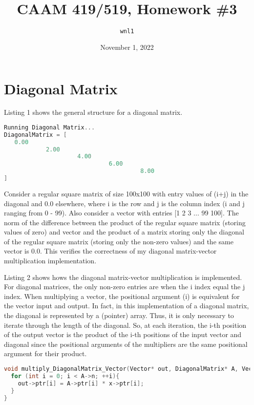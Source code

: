 \documentclass{article}
\title{CAAM 419/519, Homework \#3}
\author{\texttt{wnl1}}
\date{November 1, 2022}
\begin{document}
\maketitle

\section{Diagonal Matrix}

Listing 1 shows the general structure for a diagonal matrix.

\begin{lstlisting}[language=C, basicstyle=\ttfamily, caption={Diagonal Matrix Output.}]
Running Diagonal Matrix...
DiagonalMatrix = [
   0.00                                      
            2.00                             
                     4.00                    
                              6.00           
                                       8.00  
]
\end{lstlisting}

Consider a regular square matrix of size 100x100 with entry values of (i+j) in the diagonal and 0.0 elsewhere, where i is the row and j is the column index (i and j ranging from 0 - 99). Also consider a vector with entries [1 2 3 ... 99 100]. The norm of the difference between the product of the regular square matrix (storing values of zero) and vector and the product of a matrix storing only the diagonal of the regular square matrix (storing only the non-zero values) and the same vector is 0.0. This verifies the correctness of my diagonal matrix-vector multiplication implementation.

Listing 2 shows hows the diagonal matrix-vector multiplication is implemented. For diagonal matrices, the only non-zero entries are when the i index equal the j index. When multiplying a vector, the positional argument (i) is equivalent for the vector input and output. In fact, in this implementation of a diagonal matrix, the diagonal is represented by a (pointer) array. Thus, it is only necessary to iterate through the length of the diagonal. So, at each iteration, the i-th position of the output vector is the product of the i-th positions of the input vector and diagonal since the positional arguments of the multipliers are the same positional argument for their product.

\begin{lstlisting}[language=C, basicstyle=\ttfamily, caption={Diagonal Matrix-Vector Multiplication Implementation.}]
void multiply_DiagonalMatrix_Vector(Vector* out, DiagonalMatrix* A, Vector* x){
  for (int i = 0; i < A->n; ++i){
    out->ptr[i] = A->ptr[i] * x->ptr[i];
  }
}
\end{lstlisting}
\end{document}
